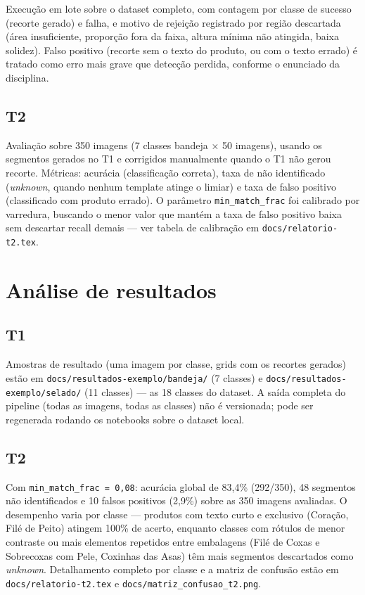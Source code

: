 \documentclass[a4paper,11pt]{article}
\begin{document}
Execução em lote sobre o dataset completo, com contagem por classe de sucesso (recorte gerado) e
falha, e motivo de rejeição registrado por região descartada (área insuficiente, proporção fora
da faixa, altura mínima não atingida, baixa solidez). Falso positivo (recorte sem o texto do
produto, ou com o texto errado) é tratado como erro mais grave que detecção perdida, conforme o
enunciado da disciplina.

\subsection{T2}

Avaliação sobre 350 imagens (7 classes bandeja × 50 imagens), usando os segmentos gerados no T1
e corrigidos manualmente quando o T1 não gerou recorte. Métricas: acurácia (classificação
correta), taxa de não identificado (\emph{unknown}, quando nenhum template atinge o limiar) e
taxa de falso positivo (classificado com produto errado). O parâmetro \texttt{min\_match\_frac}
foi calibrado por varredura, buscando o menor valor que mantém a taxa de falso positivo baixa
sem descartar recall demais --- ver tabela de calibração em
\texttt{docs/relatorio-t2.tex}.

\section{Análise de resultados}

\subsection{T1}

Amostras de resultado (uma imagem por classe, grids com os recortes gerados) estão em
\texttt{docs/resultados-exemplo/bandeja/} (7 classes) e
\texttt{docs/resultados-exemplo/selado/} (11 classes) --- as 18 classes do dataset. A saída
completa do pipeline (todas as imagens, todas as classes) não é versionada; pode ser
regenerada rodando os notebooks sobre o dataset local.

\subsection{T2}

Com \texttt{min\_match\_frac = 0,08}: acurácia global de 83,4\% (292/350), 48 segmentos não
identificados e 10 falsos positivos (2,9\%) sobre as 350 imagens avaliadas. O desempenho varia
por classe --- produtos com texto curto e exclusivo (Coração, Filé de Peito) atingem 100\% de
acerto, enquanto classes com rótulos de menor contraste ou mais elementos repetidos entre
embalagens (Filé de Coxas e Sobrecoxas com Pele, Coxinhas das Asas) têm mais segmentos
descartados como \emph{unknown}. Detalhamento completo por classe e a matriz de confusão estão
em \texttt{docs/relatorio-t2.tex} e \texttt{docs/matriz\_confusao\_t2.png}.
\end{document}
